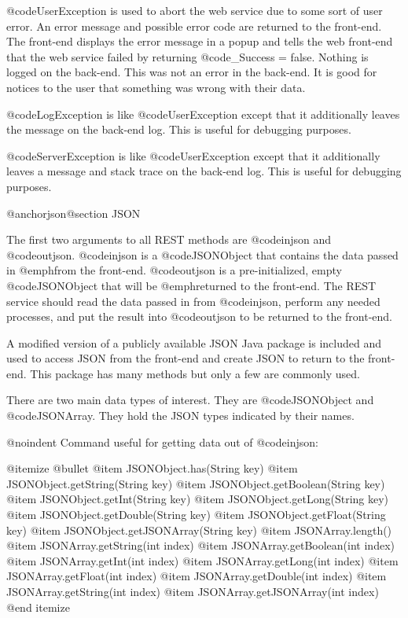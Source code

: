 @code{UserException} is used to abort the web service due to some sort
of user error.  An error message and possible error code are
returned to the front-end.  The front-end displays the error message
in a popup and tells the web front-end that the web service failed by
returning @code{_Success = false}.  Nothing is logged on the back-end.
This was not an error in the back-end.  It is good for notices to the user that
something was wrong with their data.

@code{LogException} is like @code{UserException} except that it additionally leaves the message on the back-end log.  This is useful
for debugging purposes.

@code{ServerException} is like @code{UserException} except that it additionally leaves a message and stack trace on the back-end log.  This is useful
for debugging purposes.

@anchor{json}@section JSON

The first two arguments to all REST methods are @code{injson} and
@code{outjson}.  @code{injson} is a @code{JSONObject} that contains
the data passed in @emph{from} the front-end.  @code{outjson} is a
pre-initialized, empty @code{JSONObject} that will be @emph{returned
to} the front-end.  The REST service should read the data passed in
from @code{injson}, perform any needed processes, and put the result
into @code{outjson} to be returned to the front-end.

A modified version of a publicly available JSON Java package is
included and used to access JSON from the front-end and create JSON to
return to the front-end.  This package has many methods but only a few are
commonly used.

There are two main data types of interest.  They are @code{JSONObject} and
@code{JSONArray}.  They hold the JSON types indicated by their names.

@noindent
Command useful for getting data out of @code{injson}:

@itemize @bullet
@item
JSONObject.has(String key)
@item
JSONObject.getString(String key)
@item
JSONObject.getBoolean(String key)
@item
JSONObject.getInt(String key)
@item
JSONObject.getLong(String key)
@item
JSONObject.getDouble(String key)
@item
JSONObject.getFloat(String key)
@item
JSONObject.getJSONArray(String key)
@item
JSONArray.length()
@item
JSONArray.getString(int index)
@item
JSONArray.getBoolean(int index)
@item
JSONArray.getInt(int index)
@item
JSONArray.getLong(int index)
@item
JSONArray.getFloat(int index)
@item
JSONArray.getDouble(int index)
@item
JSONArray.getString(int index)
@item
JSONArray.getJSONArray(int index)
@end itemize

